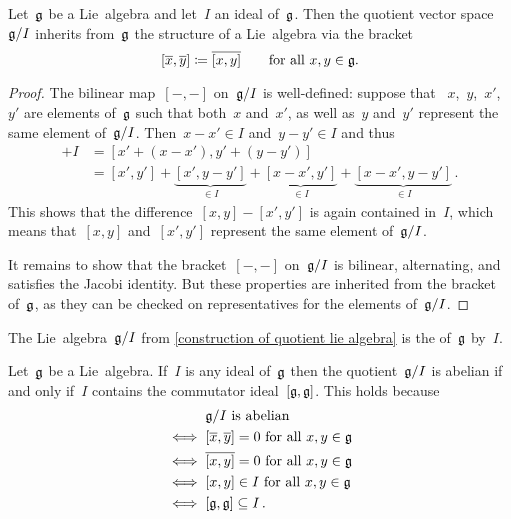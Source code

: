 \begin{proposition}
  \label{construction of quotient lie algebra}
  Let~$\mathfrak{g}$ be a Lie~algebra and let~$I$ an ideal of~$\mathfrak{g}$.
  Then the quotient vector space~$\mathfrak{g}/I$ inherits from~$\mathfrak{g}$ the structure of a Lie~algebra via the bracket
  \[
    [\overline{x}, \overline{y}]
    \coloneqq
    \overline{ [x,y] }
    \qquad
    \text{for all~$x, y \in \mathfrak{g}$.}
  \]
\end{proposition}


\begin{proof}
  The bilinear map~$[-,-]$ on~$\mathfrak{g}/I$ is well-defined:
  suppose that ~$x$,~$y$,~$x'$,~$y'$ are elements of~$\mathfrak{g}$ such that both~$x$ and~$x'$, as well as~$y$ and~$y'$ represent the same element of~$\mathfrak{g} / I$.
  Then~$x - x' \in I$ and~$y - y' \in I$ and thus
  \begin{align*}
    [x,y] + I
    &=
    [x' + (x-x'), y' + (y-y')]
    \\
    &=
    [x',y']
    + \underbrace{[x', y-y']}_{\in I}
    + \underbrace{[x-x', y']}_{\in I}
    + \underbrace{[x-x', y-y']}_{\in I} \,.
  \end{align*}
  This shows that the difference~$[x, y] - [x', y']$ is again contained in~$I$, which means that~$[x, y]$ and~$[x', y']$ represent the same element of~$\mathfrak{g} / I$.
  
  It remains to show that the bracket~$[-,-]$ on~$\mathfrak{g} / I$ is bilinear, alternating, and satisfies the Jacobi identity.
  But these properties are inherited from the bracket of~$\mathfrak{g}$, as they can be checked on representatives for the elements of~$\mathfrak{g} / I$.
\end{proof}


\begin{definition}
  The Lie~algebra~$\mathfrak{g} / I$ from \cref{construction of quotient lie algebra} is the  of~$\mathfrak{g}$ by~$I$.
\end{definition}


\begin{example}
  \label{quotient is abelian iff moded out the commutator ideal}
  Let~$\mathfrak{g}$ be a Lie~algebra.
  If~$I$ is any ideal of~$\mathfrak{g}$ then the quotient~$\mathfrak{g} / I$ is abelian if and only if~$I$ contains the commutator ideal~$[\mathfrak{g}, \mathfrak{g}]$.
  This holds because
  \begin{align*}
    {}&
    \text{$\mathfrak{g} / I$ is abelian}
    \\
    \iff{}&
    \text{$[ \overline{x}, \overline{y}] = 0$ for all~$x, y \in \mathfrak{g}$}
    \\
    \iff{}&
    \text{$\overline{[x,y]} = 0$ for all~$x, y \in \mathfrak{g}$}
    \\
    \iff{}&
    \text{$[x,y] \in I$ for all~$x, y \in \mathfrak{g}$}
    \\
    \iff{}&
    [\mathfrak{g}, \mathfrak{g}] \subseteq I \,.
  \end{align*}
\end{example}


